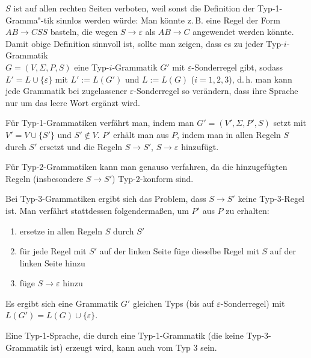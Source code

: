 \begin{Bem}
    $S$ ist auf allen rechten Seiten verboten, weil sonst die Definition
    der Typ-1-Gramma"-tik sinnlos werden würde:
    Man könnte z.\,B. eine Regel der Form $AB \rightarrow CSS$
    basteln, die wegen $S \rightarrow \varepsilon$ als $AB \rightarrow C$
    angewendet werden könnte.\\
    Damit obige Definition sinnvoll ist, sollte man zeigen,
    dass es zu jeder Typ-$i$-Grammatik\\
    $G = (V, \Sigma, P, S)$ eine Typ-$i$-Grammatik $G'$ mit
    $\varepsilon$-Sonderregel gibt, sodass
    $L' = L \cup \{\varepsilon\}$ mit $L' := L(G')$ und $L := L(G)$
    ($i = 1, 2, 3$), d.\,h. man kann jede Grammatik bei zugelassener
    $\varepsilon$-Sonderregel so verändern, dass ihre Sprache nur um
    das leere Wort ergänzt wird.

    Für Typ-1-Grammatiken verfährt man, indem man
    $G' = (V', \Sigma, P', S)$ setzt mit $V' = V \cup \{S'\}$
    und $S' \notin V$.
    $P'$ erhält man aus $P$, indem man in allen Regeln $S$ durch $S'$ ersetzt
    und die Regeln $S \rightarrow S'$, $S \rightarrow \varepsilon$
    hinzufügt.

    Für Typ-2-Grammatiken kann man genauso verfahren, da
    die hinzugefügten Regeln (insbesondere $S \rightarrow S'$)
    Typ-2-konform sind.

    Bei Typ-3-Grammatiken ergibt sich das Problem, dass $S \rightarrow S'$
    keine Typ-3-Regel ist.
    Man verfährt stattdessen folgendermaßen, um $P'$ aus $P$ zu erhalten:
    \begin{enumerate}
        \item
        ersetze in allen Regeln $S$ durch $S'$

        \item
        für jede Regel mit $S'$ auf der linken Seite füge dieselbe Regel
        mit $S$ auf der linken Seite hinzu

        \item
        füge $S \rightarrow \varepsilon$ hinzu
    \end{enumerate}
    Es ergibt sich eine Grammatik $G'$ gleichen Typs
    (bis auf $\varepsilon$-Sonderregel) mit
    $L(G') = L(G) \cup \{\varepsilon\}$.
\end{Bem}

\linie

\begin{Bem}
    Eine Typ-1-Sprache, die durch eine Typ-1-Grammatik
    (die keine Typ-3-Grammatik ist) erzeugt wird,
    kann auch vom Typ 3 sein.
\end{Bem}

